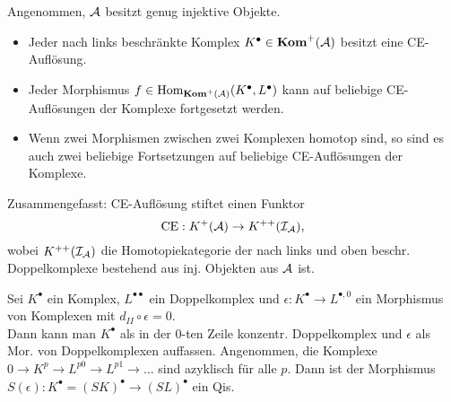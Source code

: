\documentclass{cheat-sheet}
\newenvironment{centertikzcd}
  {\begin{center}\begin{tikzcd}}
  {\end{tikzcd}\end{center}}
\newcommand{\CCC}[1]{{#1}^{\bullet}} %
\newcommand{\DC}[1]{{#1}^{\bullet \bullet}} %
\newcommand{\keS}{k.\,e.\,S.} %
\begin{document}


\begin{lem}
  Angenommen, $\mathcal{A}$ besitzt genug injektive Objekte.
  \begin{itemize}
    \item Jeder nach links beschränkte Komplex $\CCC{K} \in \Kom^+(\Aat)$ besitzt eine CE-Auflösung.
    \item Jeder Morphismus $f \in \Hom_{\Kom^+(\Aat)}(\CCC{K}, \CCC{L})$ kann auf beliebige CE-Auflösungen der Komplexe fortgesetzt werden.
    \item Wenn zwei Morphismen zwischen zwei Komplexen homotop sind, so sind es auch zwei beliebige Fortsetzungen auf beliebige CE-Auflösungen der Komplexe.
  \end{itemize}
\end{lem}

\begin{bem}
  Zusammengefasst: CE-Auflösung stiftet einen Funktor
  \[ \mathrm{CE} : K^+(\mathcal{A}) \to K^{++}(\mathcal{I}_{\mathcal{A}}), \]
  wobei $K^{++}(\mathcal{I}_{\mathcal{A}})$ die Homotopiekategorie der nach links und oben beschr. Doppelkomplexe bestehend aus inj. Objekten aus $\mathcal{A}$ ist.
\end{bem}

\begin{lem}
  Sei $\CCC{K}$ ein Komplex, $\DC{L}$ ein Doppelkomplex und $\epsilon : \CCC{K} \to L^{\bullet,0}$ ein Morphismus von Komplexen mit $d_{II} \circ \epsilon = 0$. \\
  Dann kann man $\CCC{K}$ als in der $0$-ten Zeile konzentr. Doppelkomplex und $\epsilon$ als Mor. von Doppelkomplexen auffassen.
  Angenommen, die Komplexe
  $0 \to K^p \to L^{p0} \to L^{p1} \to \ldots$
  sind azyklisch für alle $p$.
  Dann ist der Morphismus $S(\epsilon) : \CCC{K} = \CCC{(SK)} \to \CCC{(SL)}$ ein Qis.
\end{lem}
\end{document}
